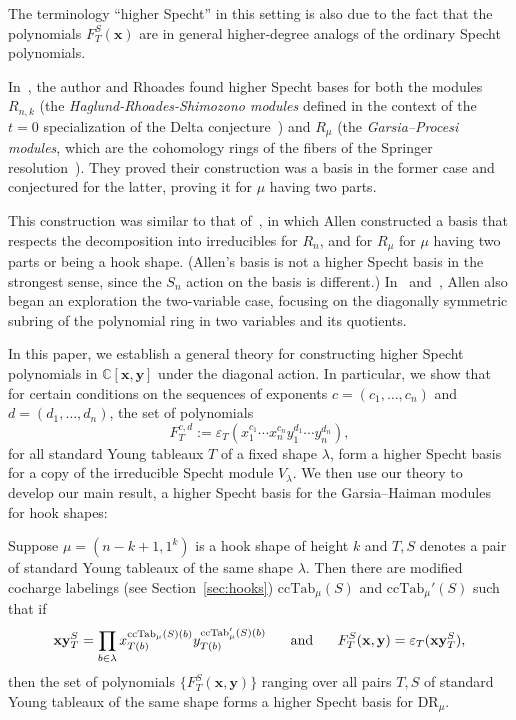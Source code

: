 \documentclass[ALCO,Unicode]{cedram}
\newcommand{\ccind}{\mathrm{ccTab}}
\newcommand{\DR}{\mathrm{DR}}
\begin{document}
The terminology ``higher Specht'' in this setting is also due to the fact that the polynomials $F_T^S(\mathbf{x})$ are in general higher-degree analogs of the ordinary Specht polynomials.

In~\cite{GillespieRhoades}, the author and Rhoades found higher Specht bases for both the modules $R_{n,k}$ (the \textit{Haglund-Rhoades-Shimozono modules} defined in the context of the $t=0$ specialization of the Delta conjecture~\cite{HRS}) and $R_\mu$ (the \textit{Garsia--Procesi modules}, which are the cohomology rings of the fibers of the Springer resolution~\cite{DeConciniProcesi,GarsiaProcesi,Tanisaki}).  They proved their construction was a basis in the former case and conjectured for the latter, proving it for $\mu$ having two parts.  

This construction was similar to that of~\cite{AllenOneVariable}, in which Allen constructed a basis that respects the decomposition into irreducibles for $R_n$, and for $R_\mu$ for $\mu$ having two parts or being a hook shape.  (Allen's basis is not a higher Specht basis in the strongest sense, since the $S_n$ action on the basis is different.)  In~\cite{AllenDescentMonomials} and~\cite{AllenBitableaux1}, Allen also began an exploration the two-variable case, focusing on the diagonally symmetric subring of the polynomial ring in two variables and its quotients.  

In this paper, we establish a general theory for constructing higher Specht polynomials in $\mathbb{C}[\mathbf{x},\mathbf{y}]$ under the diagonal action.  In particular, we show that for certain conditions on the sequences of exponents $c=(c_1,\ldots,c_n)$ and $d=(d_1,\ldots,d_n)$, the set of polynomials $$F_T^{c,d}:=\varepsilon_T (x_1^{c_1}\cdots x_n^{c_n}y_1^{d_1}\cdots y_n^{d_n}),$$ for all standard Young tableaux $T$ of a fixed shape $\lambda$, form a higher Specht basis for a copy of the irreducible Specht module $V_\lambda$.  We then use our theory to develop our main result, a higher Specht basis for the Garsia--Haiman modules for hook shapes:

\begin{thm}\label{thm:main}
	Suppose $\mu=(n-k+1,1^k)$ is a hook shape of height $k$ and $T,S$ denotes a pair of standard Young tableaux of the same shape $\lambda$.  Then there are modified cocharge labelings (see Section~\ref{sec:hooks}) $\ccind_\mu(S)$ and $\ccind_\mu'(S)$ such that if $$\mathbf{xy}_T^S=\prod_{b\in \lambda}x^{\ccind_\mu(S)(b)}_{T(b)}y_{T(b)}^{\ccind'_\mu(S)(b)}\hspace{0.5cm}\text{ and }\hspace{0.5cm}F_T^S(\mathbf{x},\mathbf{y})=\varepsilon_T(\mathbf{xy}_T^S),$$ then the set of polynomials $\{F_T^S(\mathbf{x},\mathbf{y})\}$ ranging over all pairs $T,S$ of standard Young tableaux of the same shape forms a higher Specht basis for $\DR_\mu$.
\end{thm}
\end{document}

